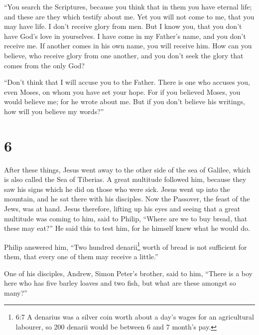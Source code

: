  ``You search the Scriptures, because you think that in
them you have eternal life; and these are they which testify about me.
 Yet you will not come to me, that you may have life.
 I don't receive glory from men.  But I know
you, that you don't have God's love in yourselves.  I have
come in my Father's name, and you don't receive me. If another comes in
his own name, you will receive him.  How can you believe,
who receive glory from one another, and you don't seek the glory that
comes from the only God?

 ``Don't think that I will accuse you to the Father. There
is one who accuses you, even Moses, on whom you have set your hope.
 For if you believed Moses, you would believe me; for he
wrote about me.  But if you don't believe his writings, how
will you believe my words?''

\hypertarget{section-5}{%
\section{6}\label{section-5}}

 After these things, Jesus went away to the other side of
the sea of Galilee, which is also called the Sea of Tiberias.
 A great multitude followed him, because they saw his signs
which he did on those who were sick.  Jesus went up into the
mountain, and he sat there with his disciples.  Now the
Passover, the feast of the Jews, was at hand.  Jesus
therefore, lifting up his eyes and seeing that a great multitude was
coming to him, said to Philip, ``Where are we to buy bread, that these
may eat?''  He said this to test him, for he himself knew
what he would do.

 Philip answered him, ``Two hundred denarii\footnote{6:7 A
  denarius was a silver coin worth about a day's wages for an
  agricultural labourer, so 200 denarii would be between 6 and 7 month's
  pay.} worth of bread is not sufficient for them, that every one of
them may receive a little.''

 One of his disciples, Andrew, Simon Peter's brother, said
to him,  ``There is a boy here who has five barley loaves
and two fish, but what are these amongst so many?''

